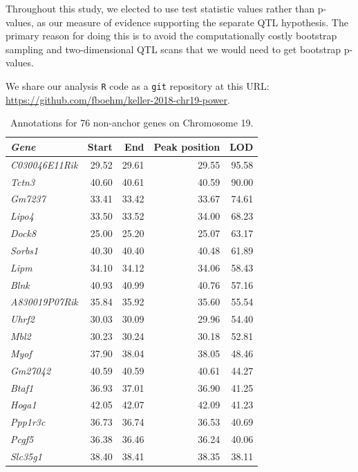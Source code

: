 \documentclass{article}
\begin{document}
Throughout this study, we elected to use test statistic values rather than p-values, as our measure of evidence supporting the separate QTL hypothesis. The primary reason for doing this is to avoid the computationally costly bootstrap sampling and two-dimensional QTL scans that we would need to get bootstrap p-values.

We share our analysis \texttt{R} code \citep{r} as a \texttt{git} repository at this URL: \url{https://github.com/fboehm/keller-2018-chr19-power}.



\printbibliography


\begin{table}[ht]
\caption{Annotations for 76 non-anchor genes on Chromosome 19.}\label{tab:ann76}
\centering
\begingroup\tiny
\begin{tabular}{>{\em}lrrrr}
  \hline
Gene & Start & End & Peak position & LOD \\ 
  \hline
C030046E11Rik & 29.52 & 29.61 & 29.55 & 95.58 \\ 
  Tctn3 & 40.60 & 40.61 & 40.59 & 90.00 \\ 
  Gm7237 & 33.41 & 33.42 & 33.67 & 74.61 \\ 
  Lipo4 & 33.50 & 33.52 & 34.00 & 68.23 \\ 
  Dock8 & 25.00 & 25.20 & 25.07 & 63.17 \\ 
  Sorbs1 & 40.30 & 40.40 & 40.48 & 61.89 \\ 
  Lipm & 34.10 & 34.12 & 34.06 & 58.43 \\ 
  Blnk & 40.93 & 40.99 & 40.76 & 57.16 \\ 
  A830019P07Rik & 35.84 & 35.92 & 35.60 & 55.54 \\ 
  Uhrf2 & 30.03 & 30.09 & 29.96 & 54.40 \\ 
  Mbl2 & 30.23 & 30.24 & 30.18 & 52.81 \\ 
  Myof & 37.90 & 38.04 & 38.05 & 48.46 \\ 
  Gm27042 & 40.59 & 40.59 & 40.61 & 44.27 \\ 
  Btaf1 & 36.93 & 37.01 & 36.90 & 41.25 \\ 
  Hoga1 & 42.05 & 42.07 & 42.09 & 41.23 \\ 
  Ppp1r3c & 36.73 & 36.74 & 36.53 & 40.69 \\ 
  Pcgf5 & 36.38 & 36.46 & 36.24 & 40.06 \\ 
  Slc35g1 & 38.40 & 38.41 & 38.35 & 38.11 \\ 

\end{tabular}
\end{table}
\end{document}

